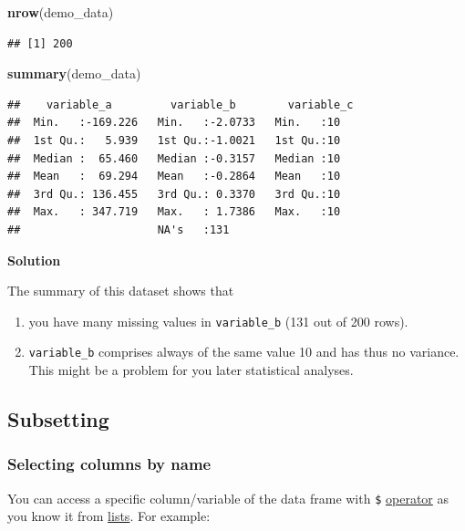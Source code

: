 \documentclass[
]{scrartcl}
\newenvironment{Shaded}{\begin{snugshade}}{\end{snugshade}}
\newcommand{\FunctionTok}[1]{\textcolor[rgb]{0.13,0.29,0.53}{\textbf{#1}}}
\newcommand{\NormalTok}[1]{#1}
\providecommand{\tightlist}{%
  \setlength{\itemsep}{0pt}\setlength{\parskip}{0pt}}
\newenvironment{webexsolution}[1]
    {\par\tiny\textbf{#1}}
    {\par}
\newcommand{\webexhide}[1]{\begin{webexsolution}{#1}}
\newcommand{\webexunhide}{\end{webexsolution}}
\begin{document}
\begin{Shaded}
\begin{Highlighting}[]
\FunctionTok{nrow}\NormalTok{(demo\_data)}
\end{Highlighting}
\end{Shaded}

\begin{verbatim}
## [1] 200
\end{verbatim}

\begin{Shaded}
\begin{Highlighting}[]
\FunctionTok{summary}\NormalTok{(demo\_data)}
\end{Highlighting}
\end{Shaded}

\begin{verbatim}
##    variable_a         variable_b        variable_c
##  Min.   :-169.226   Min.   :-2.0733   Min.   :10  
##  1st Qu.:   5.939   1st Qu.:-1.0021   1st Qu.:10  
##  Median :  65.460   Median :-0.3157   Median :10  
##  Mean   :  69.294   Mean   :-0.2864   Mean   :10  
##  3rd Qu.: 136.455   3rd Qu.: 0.3370   3rd Qu.:10  
##  Max.   : 347.719   Max.   : 1.7386   Max.   :10  
##                     NA's   :131
\end{verbatim}

\webexhide{Solution}

The summary of this dataset shows that

\begin{enumerate}
\def\labelenumi{\arabic{enumi}.}
\tightlist
\item
  you have many missing values in \texttt{variable\_b} (131 out of 200 rows).
\item
  \texttt{variable\_b} comprises always of the same value 10 and has thus no variance. This might be a problem for you later statistical analyses.
\end{enumerate}

\webexunhide

\subsection{Subsetting}\label{nolabel}

\subsubsection{Selecting columns by name}\label{selectbyname}

You can access a specific column/variable of the data frame with \texttt{\$} \hyperref[listsdollar]{operator} as you know it from \hyperref[lists]{lists}. For example:
\end{document}

